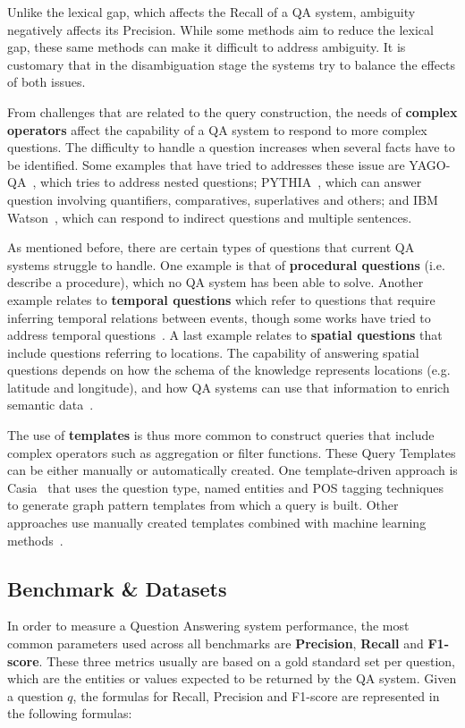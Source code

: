 Unlike the lexical gap, which affects the Recall of a QA system, ambiguity negatively affects 
its Precision. While some methods aim to reduce the lexical gap, these same methods can make it 
difficult to address ambiguity. It is customary that in the disambiguation stage the systems 
try to balance the effects of both issues.

From challenges that are related to the query construction, the needs of \textbf{complex operators} 
affect the capability of a QA system to respond to more complex questions. The difficulty to 
handle a question increases when several facts have to be identified. Some examples that have 
tried to addresses these issue are YAGO-QA~\cite{qa:AdolphsTSUW11}, which tries to address 
nested questions; PYTHIA~\cite{qa:UngerC11}, which can answer question involving quantifiers, 
comparatives, superlatives and others; and IBM Watson~\cite{qa:GliozzoK12}, which can respond 
to indirect questions and multiple sentences.

As mentioned before, there are certain types of questions that current QA systems struggle to 
handle. One example is that of \textbf{procedural questions} (i.e. describe a procedure), which 
no QA system has been able to solve. Another example relates to \textbf{temporal questions} 
which refer to questions that require inferring temporal relations between events, though some 
works have tried to address temporal questions~\cite{qa:Allen83,qa:FerrandezSKDFNITONMG11,
qa:MeloRN11}. A last example relates to \textbf{spatial questions} that include questions 
referring to locations. The capability of answering spatial questions depends on how the schema 
of the knowledge represents locations (e.g. latitude and longitude), and how QA systems can use 
that information to enrich semantic data~\cite{qa:YounisJTA12,qa:graph-2-ZouHWYHZ14}.

The use of \textbf{templates} is thus more common to construct \SPARQL{} queries that include 
complex operators such as aggregation or filter functions. These \SPARQL{} Query Templates can be 
either manually or automatically created. One template-driven approach is Casia~\cite{qa:shizhu2014casia} 
that uses the question type, named entities and POS tagging techniques to generate graph 
pattern templates from which a \SPARQL{} query is built. Other approaches use manually created 
templates combined with machine learning methods~\cite{qa:AbachaZ12}. 

\subsection{Benchmark \& Datasets}
\label{cap2:theoFrame/qakg/benchmarkDatasets}
In order to measure a Question Answering system performance, the most common parameters used 
across all benchmarks are \textbf{Precision}, \textbf{Recall} and \textbf{F1-score}. These 
three metrics usually are based on a gold standard set per question, which are the entities or 
values expected to be returned by the QA system. Given a question $q$, the formulas for Recall, 
Precision and F1-score are represented in the following formulas:

